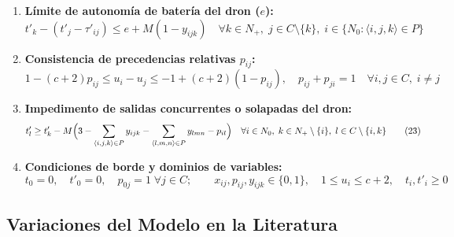 \begin{enumerate}[label=\textbf{\arabic*.}, leftmargin=*, itemsep=1.0pt, topsep=1.5pt, parsep=0pt]
\item \textbf{Límite de autonomía de batería del dron ($e$):}
\begin{equation}
t'_k - (t'_j - \tau'_{ij}) \le e + M(1 - y_{ijk}) \quad \forall k \in N_+, \; j \in C \setminus \{k\}, \; i \in \{N_0 : \langle i,j,k \rangle \in P\} 
\tag{19}
\end{equation}

\item \textbf{Consistencia de precedencias relativas $p_{ij}$:}
\begin{equation}
1 - (c+2) p_{ij} \le u_i - u_j \le -1 + (c+2)(1 - p_{ij}), \quad p_{ij} + p_{ji} = 1 \quad \forall i, j \in C, \; i \neq j 
\tag{20--22}
\end{equation}

\item \textbf{Impedimento de salidas concurrentes o solapadas del dron:}
\begin{equation}
t'_l \ge t'_k - M \Bigl(3 - \sum_{\langle i,j,k \rangle \in P} y_{ijk} - \sum_{\langle l,m,n \rangle \in P} y_{lmn} - p_{il}\Bigr) \quad \forall i \in N_0, \; k \in N_+ \setminus \{i\}, \; l \in C \setminus \{i, k\} 
\tag{23}
\end{equation}

\item \textbf{Condiciones de borde y dominios de variables:}
\begin{equation}
t_0 = 0, \quad t'_0 = 0, \quad p_{0j} = 1 \; \forall j \in C; \qquad x_{ij}, p_{ij}, y_{ijk} \in \{0, 1\}, \quad 1 \le u_i \le c+2, \quad t_i, t'_i \ge 0 
\tag{24--32}
\end{equation}

\end{enumerate}

\subsection{Variaciones del Modelo en la Literatura}

